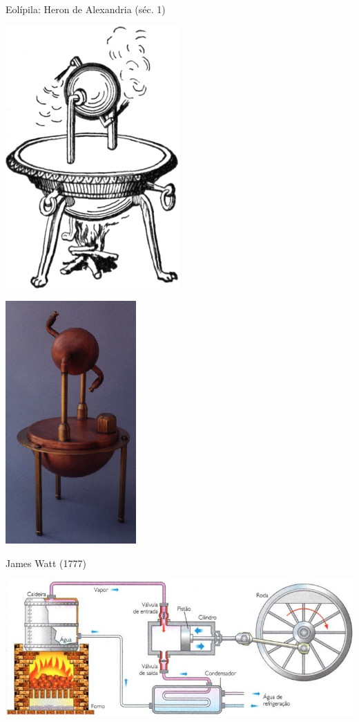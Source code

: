 \begin{multicols}{2}
Eolípila: Heron de Alexandria (séc. 1)	

\begin{center}
	\includegraphics[height=.8\textheight]{./IMG/Aeolipile_illustration.png}
\end{center}

\vfill
\columnbreak

\begin{center}
	\includegraphics[height=.9\textheight]{./IMG/Aeolipile.jpg}
\end{center}

\end{multicols}

\vfill
\pagebreak

James Watt (1777)

\begin{center}
	\includegraphics[width=.9\linewidth]{./IMG/20190205-maquina-vapor.jpg}
\end{center}


\vfill
\pagebreak

